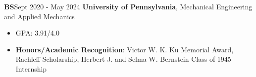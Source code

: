     \begin{threecolentry}{\textbf{BS}}{Sept 2020 - May 2024}
        \textbf{University of Pennsylvania}, Mechanical Engineering and Applied Mechanics
            \begin{itemize}[nosep,after=\strut, leftmargin=1em, itemsep=2pt]
                \item GPA: 3.91/4.0
                 \item \textbf{Honors/Academic Recognition}: Victor W. K. Ku Memorial Award, Rachleff Scholarship, Herbert J. and Selma W. Bernstein Class of 1945 Internship
            \end{itemize}
    \end{threecolentry}

